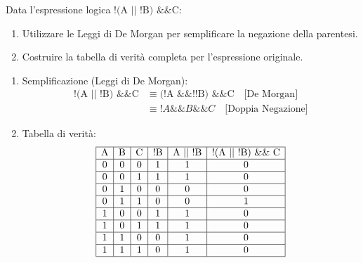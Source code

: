\begin{Exercise}[label={ex:de_morgan_tabella}]
    Data l'espressione logica $\text{!(A || !B) \&\& C}$:
    \begin{enumerate}
        \item Utilizzare le Leggi di De Morgan per semplificare la negazione della parentesi.
        \item Costruire la tabella di verità completa per l'espressione originale.
    \end{enumerate}
\end{Exercise}

\begin{Answer}[ref={ex:de_morgan_tabella}]
    \begin{enumerate}
        \item Semplificazione (Leggi di De Morgan):
        \begin{align*}
            \text{!(A || !B) \&\& C} &\equiv (\text{!A \&\& !!B) \&\& C} \quad \text{[De Morgan]} \\
            &\equiv !A \&\& B \&\& C \quad \text{[Doppia Negazione]}
        \end{align*}
        \item Tabella di verità:
            \[
            \begin{array}{|c|c|c|c|c|c|}
                \hline
                \text{A} & \text{B} & \text{C} & \text{!B} & \text{A || !B} & \text{!(A || !B) \&\& C} \\ \hline
                0 & 0 & 0 & 1 & 1 & 0 \\ \hline
                0 & 0 & 1 & 1 & 1 & 0 \\ \hline
                0 & 1 & 0 & 0 & 0 & 0 \\ \hline
                0 & 1 & 1 & 0 & 0 & 1 \\ \hline
                1 & 0 & 0 & 1 & 1 & 0 \\ \hline
                1 & 0 & 1 & 1 & 1 & 0 \\ \hline
                1 & 1 & 0 & 0 & 1 & 0 \\ \hline
                1 & 1 & 1 & 0 & 1 & 0 \\ \hline
        
            \end{array}
            \]
    \end{enumerate}
\end{Answer}